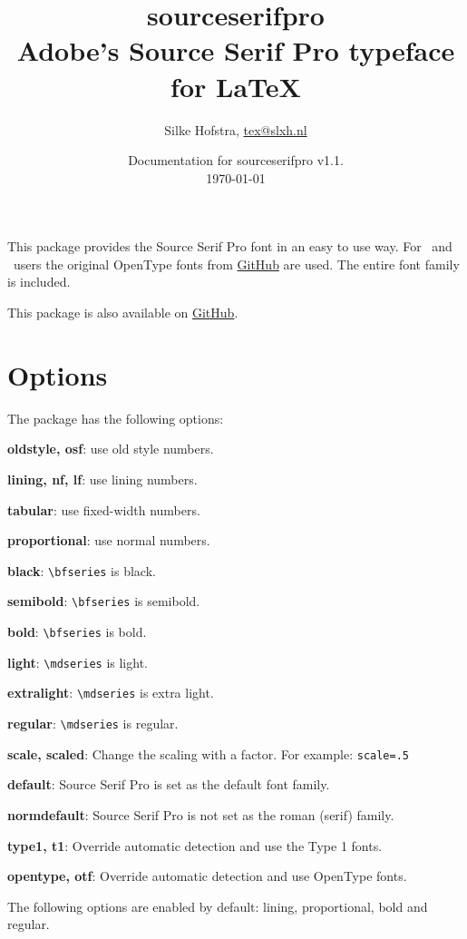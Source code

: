 \documentclass[10pt,a4paper,english]{article}
\title{\bfseries
	\Huge sourceserifpro\\
	\Large Adobe's Source Serif Pro typeface for \LaTeX
}
\author{Silke Hofstra, \href{mailto:tex@slxh.nl}{tex@slxh.nl}}
\date{Documentation for sourceserifpro v1.1.\\ \today}
\begin{document}
\maketitle
\begin{multicols}{2}
This package provides the Source Serif Pro font in an easy to use way. For \XeLaTeX\ and \LuaLaTeX\ users the original OpenType fonts from \href{https://github.com/adobe-fonts/source-serif-pro}{GitHub} are used. The entire font family is included.

This package is also available on \href{https://github.com/silkeh/latex-sourceserifpro}{GitHub}.

\section{Options}
The package has the following options:
\begin{itemize*}
	\item \textbf{oldstyle, osf}:  use old style numbers.
	\item \textbf{lining, nf, lf}: use lining numbers.
	\item \textbf{tabular}:        use fixed-width numbers.
	\item \textbf{proportional}:   use normal numbers.
	\item \textbf{black}:          \texttt{\textbackslash bfseries} is black.
	\item \textbf{semibold}:       \texttt{\textbackslash bfseries} is semibold.
	\item \textbf{bold}:           \texttt{\textbackslash bfseries} is bold.
	\item \textbf{light}:          \texttt{\textbackslash mdseries} is light.
	\item \textbf{extralight}:     \texttt{\textbackslash mdseries} is extra light.
	\item \textbf{regular}:        \texttt{\textbackslash mdseries} is regular.
	\item \textbf{scale, scaled}:  Change the scaling with a factor. For example:  \texttt{scale=.5}
	\item \textbf{default}:        Source Serif Pro is set as the default font family.
	\item \textbf{normdefault}:    Source Serif Pro is not set as the roman (serif) family.
	\item \textbf{type1, t1}:      Override automatic detection and use the Type 1 fonts.
	\item \textbf{opentype, otf}:  Override automatic detection and use OpenType fonts.
\end{itemize*}
The following options are enabled by default: lining, proportional, bold and regular.


\end{multicols}
\end{document}
